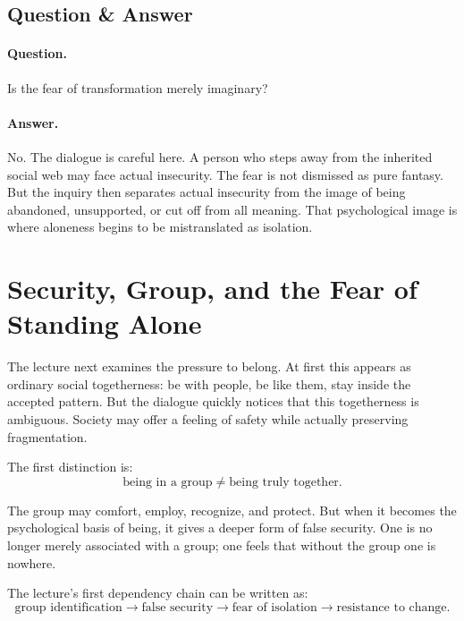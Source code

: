 \subsection{Question \& Answer}

\paragraph{Question.}
Is the fear of transformation merely imaginary?

\paragraph{Answer.}
No. The dialogue is careful here. A person who steps away from the inherited social web may face actual insecurity. The fear is not dismissed as pure fantasy. But the inquiry then separates actual insecurity from the image of being abandoned, unsupported, or cut off from all meaning. That psychological image is where aloneness begins to be mistranslated as isolation.

\section{Security, Group, and the Fear of Standing Alone}

The lecture next examines the pressure to belong. At first this appears as ordinary social togetherness: be with people, be like them, stay inside the accepted pattern. But the dialogue quickly notices that this togetherness is ambiguous. Society may offer a feeling of safety while actually preserving fragmentation.

The first distinction is:
\begin{equation}
\text{being in a group} \neq \text{being truly together}.
\end{equation}

The group may comfort, employ, recognize, and protect. But when it becomes the psychological basis of being, it gives a deeper form of false security. One is no longer merely associated with a group; one feels that without the group one is nowhere.

The lecture's first dependency chain can be written as:
\begin{equation}
\text{group identification}
\longrightarrow
\text{false security}
\longrightarrow
\text{fear of isolation}
\longrightarrow
\text{resistance to change}.
\end{equation}

